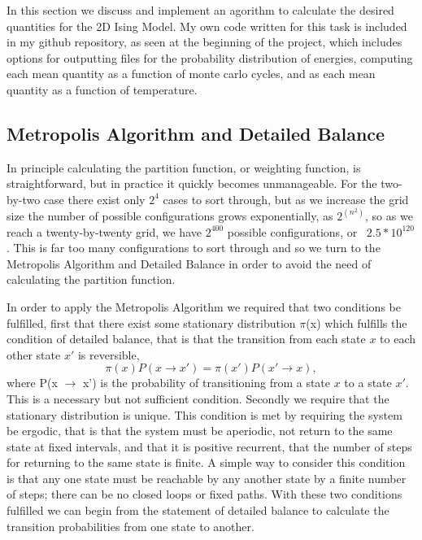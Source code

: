 \documentclass[11pt,a4paper]{article}
\begin{document}
In this section we discuss and implement an agorithm to calculate the desired quantities for the 2D Ising Model. My own code written for this task is included in my github repository, as seen at the beginning of the project, which includes options for outputting files for the probability distribution of energies, computing each mean quantity as a function of monte carlo cycles, and as each mean quantity as a function of temperature.

\subsection{Metropolis Algorithm and Detailed Balance}

In principle calculating the partition function, or weighting function, is straightforward, but in practice it quickly becomes unmanageable. For the two-by-two case there exist only $2^4$ cases to sort through, but as we increase the grid size the number of possible configurations grows exponentially, as $2^{(n^2)}$, so as we reach a twenty-by-twenty grid, we have $2^{400}$ possible configurations, or ~$2.5*10^{120}$. This is far too many configurations to sort through and so we turn to the Metropolis Algorithm and Detailed Balance in order to avoid the need of calculating the partition function.

In order to apply the Metropolis Algorithm we required that two conditions be fulfilled, first that there exist some stationary distribution $\pi$(x) which fulfills the condition of detailed balance, that is that the transition from each state $x$ to each other state $x'$ is reversible,
\begin{equation}
\pi(x)P(x \rightarrow x') = \pi(x')P(x'\rightarrow x),
\end{equation}
where P(x $\rightarrow$ x') is the probability of transitioning from a state $x$ to a state $x'$. This is a necessary but not sufficient condition. Secondly we require that the stationary distribution is unique. This condition is met by requiring the system be ergodic, that is that the system must be aperiodic, not return to the same state at fixed intervals, and that it is positive recurrent, that the number of steps for returning to the same state is finite. A simple way to consider this condition is that any one state must be reachable by any another state by a finite number of steps; there can be no closed loops or fixed paths. With these two conditions fulfilled we can begin from the statement of detailed balance to calculate the transition probabilities from one state to another.
\end{document}

